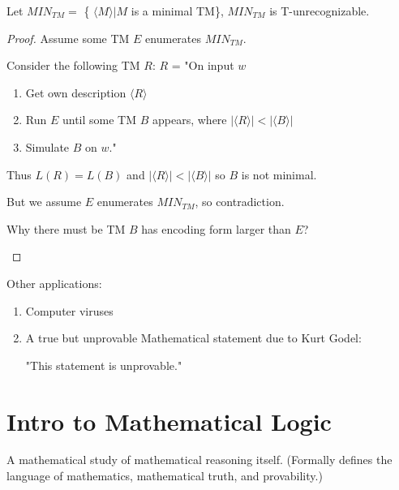 \begin{theorem}
    Let \(MIN_{TM} = \)  \{
        \(\langle M \rangle | M\) is a minimal TM\}, 
    \(MIN_{TM}\) is T-unrecognizable.
\end{theorem}
\begin{proof}
    Assume some TM \(E\) enumerates \(MIN_{TM}\).  

    Consider the following TM \(R\):
    \(R\) = "On input \(w\)
    \begin{enumerate}
        \item Get own description \(\langle R \rangle\)
        \item Run \(E\) until some TM \(B\) appears, where \(|\langle R \rangle| < |\langle B \rangle|\)
        \item Simulate \(B\) on \(w\)."  
    \end{enumerate}  

    Thus \(L(R) = L(B)\) and \(|\langle R \rangle| < |\langle B \rangle|\) so \(B\) is not minimal.   

    But we assume \(E\) enumerates \(MIN_{TM}\), so contradiction.  

    \begin{note}
        Why there must be TM \(B\) has encoding form larger than \(E\)?  
    \end{note}
\end{proof}


Other applications:
\begin{enumerate}
    \item Computer viruses
    \item A true but unprovable Mathematical statement due to Kurt Godel:

    "This statement is unprovable."
\end{enumerate}

\section{Intro to Mathematical Logic}
\begin{definition}[Goal]
    A mathematical study of mathematical reasoning itself. (Formally defines the language of mathematics, mathematical truth, and provability.)
\end{definition}


